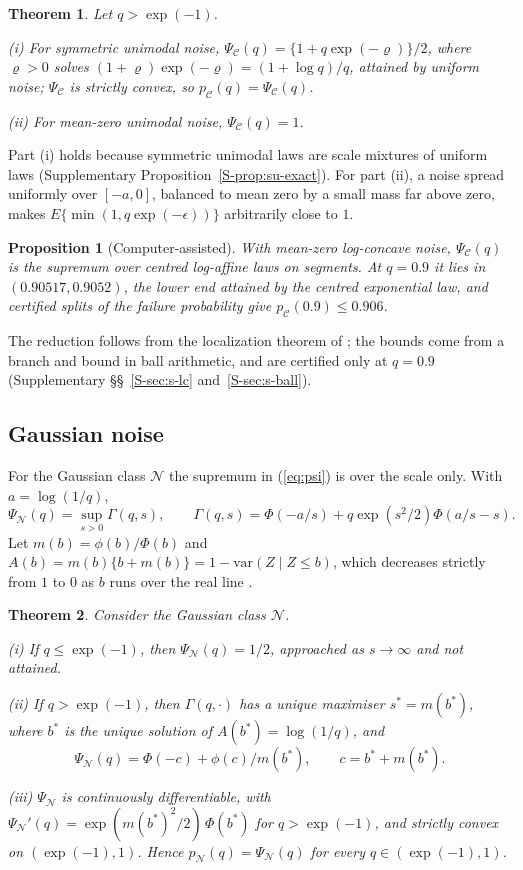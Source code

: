 \documentclass[12pt]{article}
\newtheorem{theorem}{Theorem}
\newtheorem{proposition}{Proposition}
\theoremstyle{definition}
\newcommand{\E}{\mathcal{C}}
\newcommand{\N}{\mathcal{N}}
\newcommand{\var}{\mathrm{var}}
\begin{document}
\begin{theorem}\label{thm:classes}
Let $q > \exp(-1)$.
\par\noindent (i) For symmetric unimodal noise, $\Psi_{\E}(q) = \{1 + q \exp(-\varrho)\}/2$, where $\varrho > 0$ solves $(1 + \varrho)\exp(-\varrho) = (1 + \log q)/q$, attained by uniform noise; $\Psi_{\E}$ is strictly convex, so $p_{\E}(q) = \Psi_{\E}(q)$.
\par\noindent (ii) For mean-zero unimodal noise, $\Psi_{\E}(q) = 1$.
\end{theorem}
Part (i) holds because symmetric unimodal laws are scale mixtures of uniform laws (Supplementary Proposition~\ref{S-prop:su-exact}). For part (ii), a noise spread uniformly over $[-a, 0]$, balanced to mean zero by a small mass far above zero, makes $E\{\min(1, q\exp(-\epsilon))\}$ arbitrarily close to $1$.

\begin{proposition}[Computer-assisted]\label{prop:lc}
With mean-zero log-concave noise, $\Psi_{\E}(q)$ is the supremum over centred log-affine laws on segments. At $q = 0.9$ it lies in $(0.90517, 0.9052)$, the lower end attained by the centred exponential law, and certified splits of the failure probability give $p_{\E}(0.9) \le 0.906$.
\end{proposition}
The reduction follows from the localization theorem of \citet{fradelizi2004}; the bounds come from a branch and bound in ball arithmetic, and are certified only at $q = 0.9$ (Supplementary \S\S~\ref{S-sec:s-lc} and~\ref{S-sec:s-ball}).

\subsection{Gaussian noise}

For the Gaussian class $\N$ the supremum in (\ref{eq:psi}) is over the scale only. With $a = \log(1/q)$,
\begin{equation}\label{eq:G}
\Psi_{\N}(q) = \sup_{s > 0} \Gamma(q, s), \qquad \Gamma(q, s) = \Phi(-a/s) + q\exp(s^2/2)\Phi(a/s - s).
\end{equation}
Let $m(b) = \phi(b)/\Phi(b)$ and $A(b) = m(b)\{b + m(b)\} = 1 - \var(Z \mid Z \le b)$, which decreases strictly from $1$ to $0$ as $b$ runs over the real line \citep{sampford1953}.

\begin{theorem}\label{thm:gauss}
Consider the Gaussian class $\N$.
\par\noindent (i) If $q \le \exp(-1)$, then $\Psi_{\N}(q) = 1/2$, approached as $s \to \infty$ and not attained.
\par\noindent (ii) If $q > \exp(-1)$, then $\Gamma(q, \cdot)$ has a unique maximiser $s^* = m(b^*)$, where $b^*$ is the unique solution of $A(b^*) = \log(1/q)$, and
\[
\Psi_{\N}(q) = \Phi(-c) + \phi(c)/m(b^*), \qquad c = b^* + m(b^*).
\]
\par\noindent (iii) $\Psi_{\N}$ is continuously differentiable, with $\Psi_{\N}'(q) = \exp(m(b^*)^2/2)\,\Phi(b^*)$ for $q > \exp(-1)$, and strictly convex on $(\exp(-1), 1)$. Hence $p_{\N}(q) = \Psi_{\N}(q)$ for every $q \in (\exp(-1), 1)$.
\end{theorem}
\end{document}
